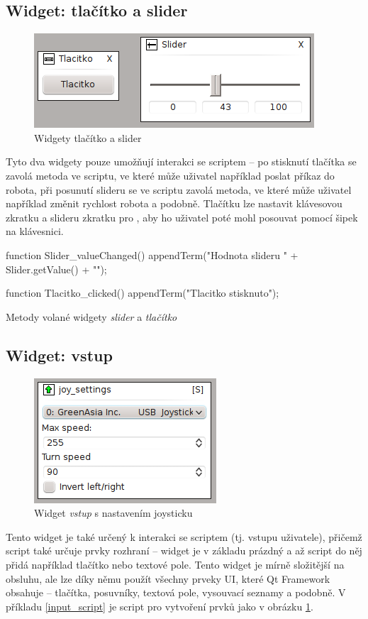 \documentclass[12pt, a4paper, oneside]{article}
\newcommand{\It}{\textit}  %
\begin{document}
\subsection{Widget: tlačítko a slider}
\begin{figure}[H]
\begin{center}
\includegraphics[scale=1]{img/w_btn_slider.png}
\caption{Widgety tlačítko a slider}
\end{center}
\end{figure}
Tyto dva widgety pouze umožňují interakci se scriptem -- po stisknutí tlačítka se zavolá metoda ve scriptu, ve které může uživatel například poslat příkaz do robota, při posunutí slideru se ve scriptu zavolá metoda, ve které může uživatel například změnit rychlost robota a podobně. Tlačítku lze nastavit klávesovou zkratku a slideru zkratku pro , aby ho uživatel poté mohl posouvat pomocí šipek na klávesnici.
\begin{listing}[H]
\begin{jscode}
function Slider_valueChanged() {
    appendTerm("Hodnota slideru " + Slider.getValue() + "\n");
}

function Tlacitko_clicked() {
    appendTerm("Tlacitko stisknuto\n");
}
\end{jscode}
\caption{Metody volané widgety \It{slider} a \It{tlačítko}}
\end{listing}

\subsection{Widget: vstup}
\begin{figure}[H]
\begin{center}
\includegraphics[scale=1]{img/w_input.png}
\caption{Widget \It{vstup} s nastavením joysticku}
\label{input}
\end{center}
\end{figure}
Tento widget je také určený k interakci se scriptem (tj. vstupu uživatele), přičemž script také určuje prvky rozhraní -- widget je v základu prázdný a až script do něj přidá například tlačítko nebo textové pole. Tento widget je mírně složitější na obsluhu, ale lze díky němu použít všechny prveky UI, které Qt Framework obsahuje -- tlačítka, posuvníky, textová pole, vysouvací seznamy a podobně. V příkladu \ref{input_script} je script pro vytvoření prvků jako v obrázku \ref{input}.
\end{document}
